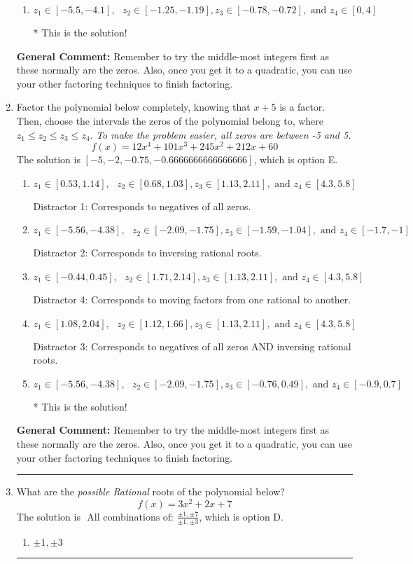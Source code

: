 \documentclass{extbook}[14pt]
\newcommand{\litem}[1]{\item #1

\rule{\textwidth}{0.4pt}}
\begin{document}
\begin{enumerate}
{\begin{enumerate}[label=\Alph*.]
 Distractor 2: Corresponds to inversing rational roots.
\item \( z_1 \in [-5.5, -4.1], \text{   }  z_2 \in [-1.25, -1.19], z_3 \in [-0.78, -0.72], \text{   and   } z_4 \in [0, 4] \)

* This is the solution!
\end{enumerate}

\textbf{General Comment:} Remember to try the middle-most integers first as these normally are the zeros. Also, once you get it to a quadratic, you can use your other factoring techniques to finish factoring.
}
\litem{
Factor the polynomial below completely, knowing that $x+5$ is a factor. Then, choose the intervals the zeros of the polynomial belong to, where $z_1 \leq z_2 \leq z_3 \leq z_4$. \textit{To make the problem easier, all zeros are between -5 and 5.}
\[ f(x) = 12x^{4} +101 x^{3} +245 x^{2} +212 x + 60 \]The solution is \( [-5, -2, -0.75, -0.6666666666666666] \), which is option E.\begin{enumerate}[label=\Alph*.]
\item \( z_1 \in [0.53, 1.14], \text{   }  z_2 \in [0.68, 1.03], z_3 \in [1.13, 2.11], \text{   and   } z_4 \in [4.3, 5.8] \)

 Distractor 1: Corresponds to negatives of all zeros.
\item \( z_1 \in [-5.56, -4.38], \text{   }  z_2 \in [-2.09, -1.75], z_3 \in [-1.59, -1.04], \text{   and   } z_4 \in [-1.7, -1] \)

 Distractor 2: Corresponds to inversing rational roots.
\item \( z_1 \in [-0.44, 0.45], \text{   }  z_2 \in [1.71, 2.14], z_3 \in [1.13, 2.11], \text{   and   } z_4 \in [4.3, 5.8] \)

 Distractor 4: Corresponds to moving factors from one rational to another.
\item \( z_1 \in [1.08, 2.04], \text{   }  z_2 \in [1.12, 1.66], z_3 \in [1.13, 2.11], \text{   and   } z_4 \in [4.3, 5.8] \)

 Distractor 3: Corresponds to negatives of all zeros AND inversing rational roots.
\item \( z_1 \in [-5.56, -4.38], \text{   }  z_2 \in [-2.09, -1.75], z_3 \in [-0.76, 0.49], \text{   and   } z_4 \in [-0.9, 0.7] \)

* This is the solution!
\end{enumerate}

\textbf{General Comment:} Remember to try the middle-most integers first as these normally are the zeros. Also, once you get it to a quadratic, you can use your other factoring techniques to finish factoring.
}
\litem{
What are the \textit{possible Rational} roots of the polynomial below?
\[ f(x) = 3x^{2} +2 x + 7 \]The solution is \( \text{ All combinations of: }\frac{\pm 1,\pm 7}{\pm 1,\pm 3} \), which is option D.\begin{enumerate}[label=\Alph*.]
\item \( \pm 1,\pm 3 \)


\end{enumerate}}
\end{enumerate}
\end{document}
